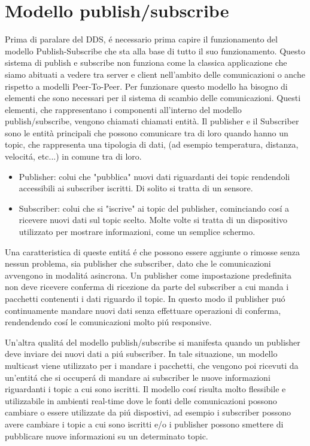 \section{Modello publish/subscribe}
Prima di paralare del DDS, é necessario prima capire il 
funzionamento del modello Publish-Subscribe 
che sta alla base di tutto il suo funzionamento.
Questo sistema di publish e subscribe non funziona come la 
classica applicazione che siamo abituati a vedere tra server e
client nell'ambito delle comunicazioni o anche rispetto a 
modelli Peer-To-Peer. Per funzionare questo modello ha bisogno di
elementi che sono necessari per il sistema di scambio delle 
comunicazioni. Questi elementi, che rappresentano i componenti all'interno
del modello publish/subscribe, vengono chiamati chiamati entità.
Il publisher e il Subscriber sono le entità principali
che possono comunicare tra di loro quando hanno un topic, che
rappresenta una tipologia di dati, (ad esempio temperatura, 
distanza, velocitá, etc...) in comune tra di loro.
\begin{itemize}
    \item Publisher: colui che "pubblica" nuovi dati riguardanti dei
    topic rendendoli accessibili ai subscriber iscritti. 
    Di solito si tratta di un sensore.
    \item Subscriber: colui che si "iscrive" ai topic del publisher, 
    cominciando
    cosí a ricevere nuovi dati sul topic scelto. Molte volte si tratta
    di un dispositivo utilizzato per mostrare informazioni, come un
    semplice schermo.
\end{itemize}
Una caratteristica di queste entitá é che possono essere aggiunte o rimosse
senza nessun problema, sia publisher che subscriber, dato che le 
comunicazioni avvengono in modalitá asincrona. Un publisher come impostazione
predefinita non deve ricevere conferma di ricezione da parte del 
subscriber a cui manda i pacchetti contenenti i dati riguardo il topic.
In questo modo il publisher puó continuamente mandare nuovi dati
senza effettuare operazioni di conferma, rendendendo cosí le comunicazioni
molto piú responsive. 

Un'altra qualitá del modello
publish/subscribe si manifesta quando
un publisher deve inviare dei nuovi dati a piú subscriber. 
In tale situazione, un
modello multicast viene utilizzato per i mandare i pacchetti, che vengono 
poi ricevuti da un'entitá che si occuperá di mandare ai subscriber
le nuove informazioni riguardanti i topic a cui sono iscritti.
Il modello cosí risulta molto
flessibile e utilizzabile in ambienti real-time dove le fonti delle
comunicazioni possono cambiare o essere utilizzate da piú dispostivi,
ad esempio i subscriber possono avere cambiare i topic a cui 
sono iscritti e/o i publisher possono smettere di pubblicare nuove
informazioni su un determinato topic.\cite{OH2010318}

